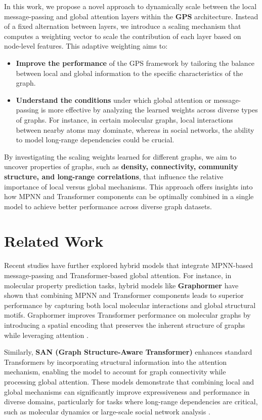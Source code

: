 \documentclass{acmart}
\begin{document}
In this work, we propose a novel approach to dynamically scale between the local message-passing and global attention layers within the \textbf{GPS} architecture. Instead of a fixed alternation between layers, we introduce a scaling mechanism that computes a weighting vector to scale the contribution of each layer based on node-level features. This adaptive weighting aims to:

\begin{itemize}
    \item \textbf{Improve the performance} of the GPS framework by tailoring the balance between local and global information to the specific characteristics of the graph.
    \item \textbf{Understand the conditions} under which global attention or message-passing is more effective by analyzing the learned weights across diverse types of graphs. For instance, in certain molecular graphs, local interactions between nearby atoms may dominate, whereas in social networks, the ability to model long-range dependencies could be crucial.
\end{itemize}

By investigating the scaling weights learned for different graphs, we aim to uncover properties of graphs, such as \textbf{density, connectivity, community structure, and long-range correlations}, that influence the relative importance of local versus global mechanisms. This approach offers insights into how MPNN and Transformer components can be optimally combined in a single model to achieve better performance across diverse graph datasets.

\section{Related Work}

Recent studies have further explored hybrid models that integrate MPNN-based message-passing and Transformer-based global attention. For instance, in molecular property prediction tasks, hybrid models like \textbf{Graphormer} \cite{ying2021graphormer, shi2022graphormer} have shown that combining MPNN and Transformer components leads to superior performance by capturing both local molecular interactions and global structural motifs. Graphormer improves Transformer performance on molecular graphs by introducing a spatial encoding that preserves the inherent structure of graphs while leveraging attention \cite{vaswani2017attention, gilmer2017neural}.

Similarly, \textbf{SAN (Graph Structure-Aware Transformer)} \cite{kreuzer2021rethinking} enhances standard Transformers by incorporating structural information into the attention mechanism, enabling the model to account for graph connectivity while processing global attention. These models demonstrate that combining local and global mechanisms can significantly improve expressiveness and performance in diverse domains, particularly for tasks where long-range dependencies are critical, such as molecular dynamics or large-scale social network analysis \cite{bacciu2020augmentation}.
\end{document}
